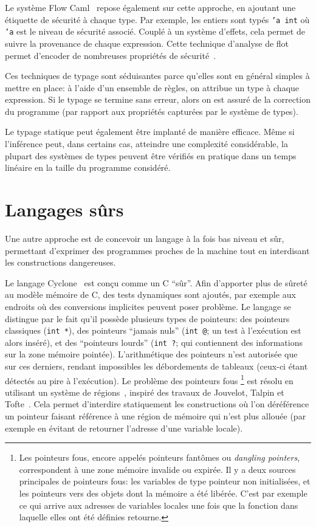 Le système Flow Caml~\cite{flowcaml} repose également sur cette approche, en
ajoutant une étiquette de sécurité à chaque type. Par exemple, les entiers sont
typés \texttt{'a int} où \texttt{'a} est le niveau de sécurité associé. Couplé à
un système d'effets, cela permet de suivre la provenance de chaque expression.
Cette technique d'analyse de flot permet d'encoder de nombreuses propriétés de
sécurité~\cite{sm-jsac03}.

Ces techniques de typage sont séduisantes parce qu'elles sont en général simples
à mettre en place: à l'aide d'un ensemble de règles, on attribue un type à
chaque expression. Si le typage se termine sans erreur, alors on est assuré de
la correction du programme (par rapport aux propriétés capturées par le système
de types).

Le typage statique peut également être implanté de manière efficace. Même si
l'inférence peut, dans certains cas, atteindre une complexité considérable, la
plupart des systèmes de types peuvent être vérifiés en pratique dans un temps
linéaire en la taille du programme considéré.

\section{Langages sûrs}

Une autre approche est de concevoir un langage à la fois bas niveau et sûr,
permettant d'exprimer des programmes proches de la machine tout en interdisant
les constructions dangereuses.

Le langage Cyclone~\cite{cyclone-safety} est conçu comme un C \enquote{sûr}.
Afin d'apporter plus de sûreté au modèle mémoire de C, des tests dynamiques sont
ajoutés, par exemple aux endroits où des conversions implicites peuvent poser
problème. Le langage se distingue par le fait qu'il possède plusieurs types de
pointeurs: des pointeurs classiques (\texttt{int *}), des pointeurs
\enquote{jamais nuls} (\texttt{int @}; un test à l'exécution est alors inséré),
et des \enquote{pointeurs lourds} (\verb!int ?!; qui contiennent des
informations sur la zone mémoire pointée). L'arithmétique des pointeurs n'est
autorisée que sur ces derniers, rendant impossibles les débordements de tableaux
(ceux-ci étant détectés au pire à l'exécution). Le problème des pointeurs fous
\footnote{
    Les pointeurs fous, encore appelés pointeurs fantômes ou \emph{dangling
    pointers}, correspondent à une zone mémoire invalide ou expirée. Il y a deux
    sources principales de pointeurs fous: les variables de type pointeur non
    initialisées, et les pointeurs vers des objets dont la mémoire a été libérée.
    C'est par exemple ce qui arrive aux adresses de variables locales une fois
    que la fonction dans laquelle elles ont été définies retourne.
}
est résolu en utilisant un système de régions~\cite{cyclone-regions}, inspiré
des travaux de Jouvelot, Talpin et \linebreak
Tofte~\cite{jfp92,ToTa1993,popl94}. Cela permet d'interdire statiquement les
constructions où l'on déréférence un pointeur faisant référence à une région de
mémoire qui n'est plus allouée (par exemple en évitant de retourner l'adresse
d'une variable locale).


